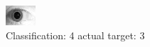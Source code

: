 \begin{figure}[h!]
\begin{center}
\includegraphics[width=0.60\columnwidth]{figures/ID1958_class_4_target_3.png}
\end{center}
\caption{ Classification: 4 actual target: 3}
\label{fig:ID1958_class_4_target_3}
\end{figure}

